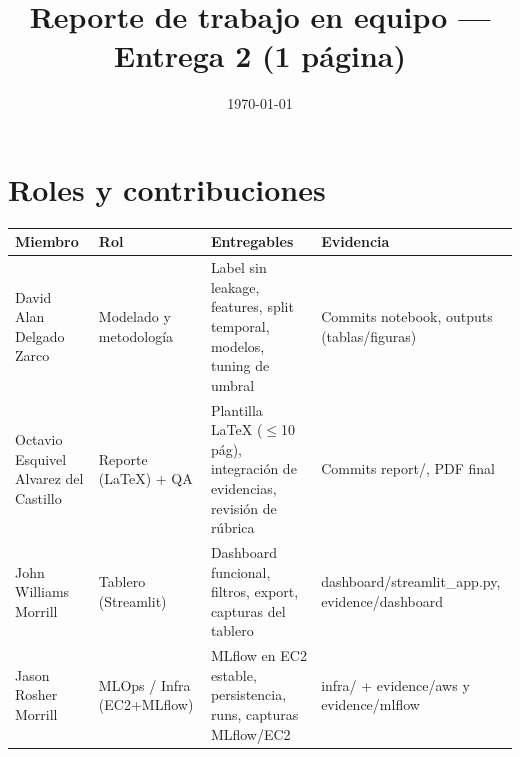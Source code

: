\documentclass[11pt]{article}
\title{Reporte de trabajo en equipo --- Entrega 2 (1 página)}
\author{}
\date{\today}
\begin{document}
\maketitle


\section*{Roles y contribuciones}

{\scriptsize
\setlength{\tabcolsep}{3pt}
\renewcommand{\arraystretch}{2.0}

\begin{table}[H]
\centering
\begin{tabularx}{\textwidth}{
>{\RaggedRight\arraybackslash}p{4.2cm}
>{\RaggedRight\arraybackslash}p{2.6cm}
>{\RaggedRight\arraybackslash}X
>{\RaggedRight\arraybackslash}p{3.2cm}}
\toprule
\textbf{Miembro} & \textbf{Rol} & \textbf{Entregables} & \textbf{Evidencia} \\
\midrule
David Alan Delgado Zarco & Modelado y metodología &
Label sin leakage, features, split temporal, modelos, tuning de umbral &
Commits notebook, outputs (tablas/figuras) \\
Octavio Esquivel Alvarez del Castillo & Reporte (LaTeX) + QA &
Plantilla LaTeX ($\leq$10 pág), integración de evidencias, revisión de rúbrica &
Commits report/, PDF final \\
John Williams Morrill & Tablero (Streamlit) &
Dashboard funcional, filtros, export, capturas del tablero &
dashboard/streamlit\_app.py, evidence/dashboard \\
Jason Rosher Morrill & MLOps / Infra (EC2+MLflow) &
MLflow en EC2 estable, persistencia, runs, capturas MLflow/EC2 &
infra/ + evidence/aws y evidence/mlflow \\
\bottomrule
\end{tabularx}
\end{table}
}
\end{document}
